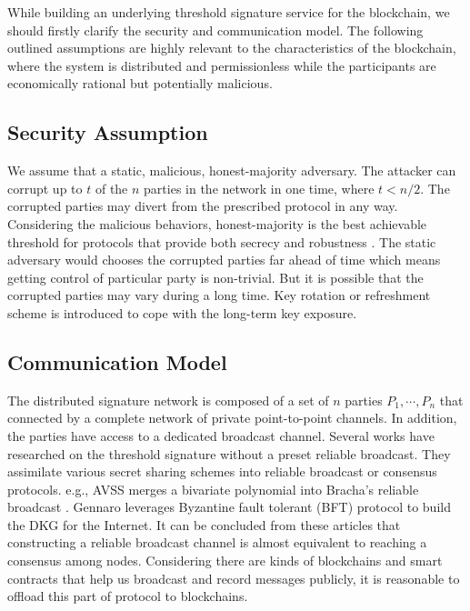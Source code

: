 \documentclass[11pt]{article}
\begin{document}
While building an underlying threshold signature service for the blockchain, we should firstly clarify the security and communication model. The following outlined assumptions are highly relevant to the characteristics of the blockchain, where the system is distributed and permissionless while the participants are economically rational but potentially malicious.

\subsection{Security Assumption}

We assume that a static, malicious, honest-majority adversary. The attacker can corrupt up to $t$ of the $n$ parties in the network in one time, where $t < n/2$. The corrupted parties may divert from the prescribed protocol in any way. Considering the malicious behaviors, honest-majority is the best achievable threshold for protocols that provide both secrecy and robustness \cite{gennaro2007secure}. The static adversary would chooses the corrupted parties far ahead of time which means getting control of particular party is non-trivial. But it is possible that the corrupted parties may vary during a long time. Key rotation or refreshment scheme is introduced to cope with the long-term key exposure.

\subsection{Communication Model}

The distributed signature network is composed of a set of $n$ parties $P_1, \cdots, P_n$ that connected by a complete network of private point-to-point channels. In addition, the parties have access to a dedicated broadcast channel. Several works\cite{kate2009distributed,kate2012distributed,cachin2002asynchronous} have researched on the threshold signature without a preset reliable broadcast. They assimilate various secret sharing schemes into reliable broadcast or consensus protocols. e.g., AVSS\cite{cachin2002asynchronous} merges a bivariate polynomial into Bracha’s reliable broadcast \cite{bracha1984asynchronous}. Gennaro\cite{gennaro2007secure} leverages Byzantine fault tolerant (BFT) protocol\cite{castro1999practical} to build the DKG for the Internet. It can be concluded from these articles that constructing a reliable broadcast channel is almost equivalent to reaching a consensus among nodes. Considering there are kinds of blockchains and smart contracts that help us broadcast and record messages publicly, it is reasonable to offload this part of protocol to blockchains.
\end{document}
